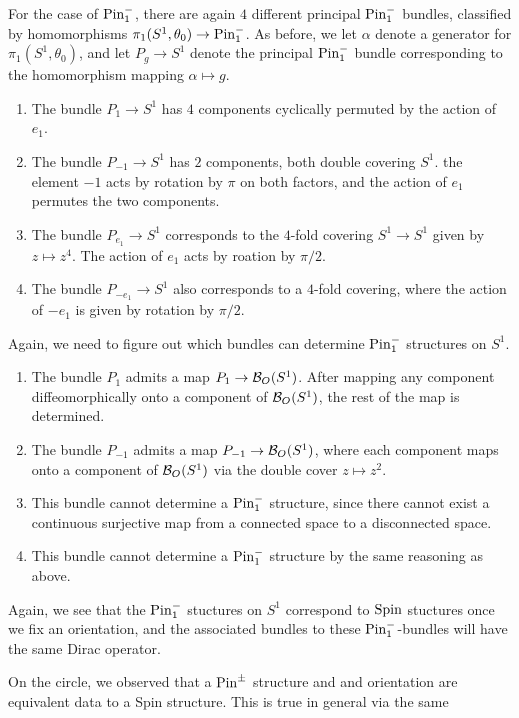 \begin{exmp}
For the case of $\mathrm{Pin}_1^-$, there are again $4$ different principal $\mathrm{Pin}_1^-$
bundles, classified by homomorphisms $\pi_1(S^1, \theta_0) \to \mathrm{Pin}_1^-$.
As before, we let $\alpha$ denote a generator for $\pi_1(S^1, \theta_0)$, and
let $P_g \to S^1$ denote the principal $\mathrm{Pin}_1^-$ bundle corresponding to
the homomorphism mapping $\alpha \mapsto g$.
%
\begin{enumerate}
  \item The bundle $P_1 \to S^1$ has $4$ components cyclically permuted
  by the action of $e_1$.
  \item The bundle $P_{-1} \to S^1$ has $2$ components, both double covering $S^1$.
  the element $-1$ acts by rotation by $\pi$ on both factors, and the action
  of $e_1$ permutes the two components.
  \item The bundle $P_{e_1} \to S^1$ corresponds to the $4$-fold covering
  $S^1 \to S^1$ given by $z \mapsto z^4$. The action of $e_1$ acts by
  roation by $\pi / 2$.
  \item The bundle $P_{-e_1} \to S^1$ also corresponds to a $4$-fold covering,
  where the action of $-e_1$ is given by rotation by $\pi / 2$.
\end{enumerate}
%
Again, we need to figure out which bundles can determine $\mathrm{Pin}_1^-$ structures
on $S^1$.
%
\begin{enumerate}
  \item The bundle $P_1$ admits a map $P_1 \to \mathcal{B}_O(S^1)$. After mapping any
  component diffeomorphically onto a component of $\mathcal{B}_O(S^1)$, the rest of the
  map is determined.
  \item The bundle $P_{-1}$ admits a map $P_{-1} \to \mathcal{B}_O(S^1)$, where
  each component maps onto a component of $\mathcal{B}_O(S^1)$ via the double cover
  $z \mapsto z^2$.
  \item This bundle cannot determine a $\mathrm{Pin}_1^-$ structure, since there
  cannot exist a continuous surjective map from a connected space to a
  disconnected space.
  \item This bundle cannot determine a $\mathrm{Pin}_1^-$ structure by the same
  reasoning as above.
\end{enumerate}
Again, we see that the $\mathrm{Pin}_1^-$ stuctures on $S^1$ correspond to $\mathrm{Spin}$
stuctures once we fix an orientation, and the associated bundles to these
$\mathrm{Pin}_1^-$-bundles will have the same Dirac operator.
\end{exmp}
%
On the circle, we observed that a $\mathrm{Pin}^\pm$ structure and and orientation
are equivalent data to a Spin structure. This is true in general via the same
